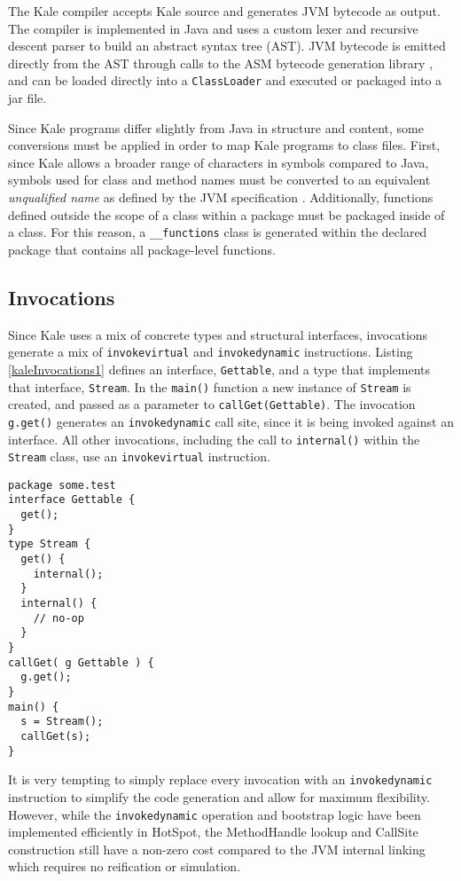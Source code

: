 The Kale compiler accepts Kale source and generates JVM bytecode as output.  The compiler is implemented in Java and uses a custom lexer and recursive descent parser to build an abstract syntax tree (AST).  JVM bytecode is emitted directly from the AST through calls to the ASM bytecode generation library \cite{asm-library}, and can be loaded directly into a \texttt{ClassLoader} and executed or packaged into a jar file.

Since Kale programs differ slightly from Java in structure and content, some conversions must be applied in order to map Kale programs to class files.  First, since Kale allows a broader range of characters in symbols compared to Java, symbols used for class and method names must be converted to an equivalent \emph{unqualified name} as defined by the JVM specification \cite[4.2.2]{jvms7}.  Additionally, functions defined outside the scope of a class within a package must be packaged inside of a class.  For this reason, a \texttt{\_\_functions} class is generated within the declared package that contains all package-level functions.

\subsection{Invocations}

Since Kale uses a mix of concrete types and structural interfaces, invocations generate a mix of \texttt{invokevirtual} and \texttt{invokedynamic} instructions.  Listing \ref{kaleInvocations1} defines an interface, \texttt{Gettable}, and a type that implements that interface, \texttt{Stream}.  In the \texttt{main()} function a new instance of \texttt{Stream} is created, and passed as a parameter to \texttt{callGet(Gettable)}.  The invocation \texttt{g.get()} generates an \texttt{invokedynamic} call site, since it is being invoked against an interface.  All other invocations, including the call to \texttt{internal()} within the \texttt{Stream} class, use an \texttt{invokevirtual} instruction.

\begin{lstlisting}[language=Kale,caption=Invocations in Kale,label=kaleInvocations1]
package some.test
interface Gettable {
  get();
}
type Stream {
  get() {
    internal();
  }
  internal() {
    // no-op
  }
}
callGet( g Gettable ) {
  g.get();
}
main() {
  s = Stream();
  callGet(s);
}
\end{lstlisting}

It is very tempting to simply replace every invocation with an \texttt{invokedynamic} instruction to simplify the code generation and allow for maximum flexibility.  However, while the \texttt{invokedynamic} operation and bootstrap logic have been implemented efficiently in HotSpot, the MethodHandle lookup and CallSite construction still have a non-zero cost compared to the JVM internal linking which requires no reification or simulation.


